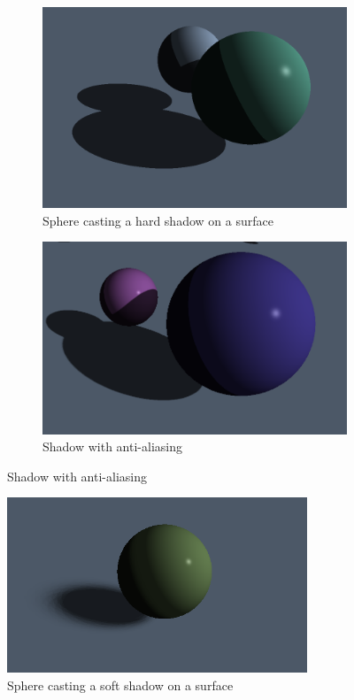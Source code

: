 \documentclass[final]{cmpreport}
\begin{document}
\begin{figure}
    \begin{subfigure}{0.5\textwidth}
        \centering
        \includegraphics[width=0.9\linewidth]{img/hard_shadow.png}
        \caption{Sphere casting a hard shadow on a surface}
        \label{hard_shadow}
    \end{subfigure}%
    \begin{subfigure}{0.5\textwidth}
        \centering
        \includegraphics[width=0.9\linewidth]{img/softish_shadow.png}
        \caption{Shadow with anti-aliasing}
        \label{softish_shadow}
    \end{subfigure}
\end{figure}

\begin{figure}
    \centering
    \includegraphics[width=0.8\textwidth]{img/soft_shadow.png}
    \caption{Sphere casting a soft shadow on a surface}
    \label{soft_shadow}
\end{figure}
\end{document}

